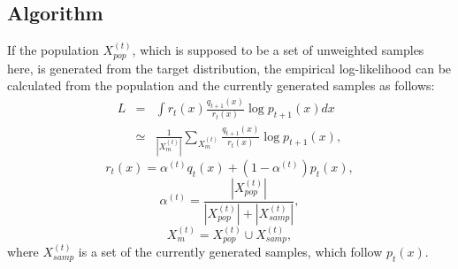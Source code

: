 \subsection{Algorithm}
\label{sec-rpm-algorithm}
If the population $X_{pop}^{(t)}$,
which is supposed to be a set of unweighted samples here,
 is generated from the target
distribution,
the empirical log-likelihood can be calculated from the population and
the currently generated samples as follows:
\begin{eqnarray}
 L&=&\int r_{t}(x) \frac{q_{t+1}(x)}{r_{t}(x)}\log p_{t+1}(x)
  dx \\
&\simeq&\frac{1}{|X_m^{(t)}|}\sum_{X_m^{(t)}}
\frac{q_{t+1}(x)}{r_{t}(x)} \log p_{t+1}(x),\label{rpm-mix-is}
\end{eqnarray}
\begin{equation}
  r_{t}(x)=\alpha^{(t)} q_{t}(x) + (1-\alpha^{(t)}) p_{t}(x),
\end{equation}
\begin{equation}
\alpha^{(t)}=\frac{|X_{pop}^{(t)}|}{|X_{pop}^{(t)}|+|X_{samp}^{(t)}|},
\end{equation}
\begin{equation}
 X_m^{(t)}=X_{pop}^{(t)} \cup X_{samp}^{(t)},
\end{equation}
where 
$X_{samp}^{(t)}$ is a set of the currently generated samples,
 which follow $p_t(x)$.



